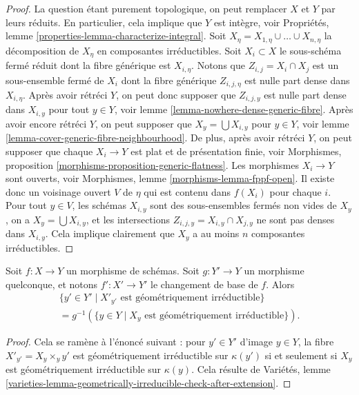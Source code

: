 \begin{proof}
La question étant purement topologique, on peut remplacer $X$ et $Y$ par
leurs réduits. En particulier, cela implique que $Y$ est intègre, voir
Propriétés, lemme \ref{properties-lemma-characterize-integral}.
Soit $X_\eta = X_{1, \eta} \cup \ldots \cup X_{n, \eta}$
la décomposition de $X_\eta$ en composantes irréductibles.
Soit $X_i \subset X$ le sous-schéma fermé réduit dont la fibre
générique est $X_{i, \eta}$. Notons que $Z_{i, j} = X_i \cap X_j$
est un sous-ensemble fermé de $X_i$ dont la fibre générique $Z_{i, j, \eta}$
est nulle part dense dans $X_{i, \eta}$. Après avoir rétréci $Y$, on peut donc
supposer que $Z_{i, j, y}$
est nulle part dense dans $X_{i, y}$ pour tout $y \in Y$, voir
lemme \ref{lemma-nowhere-dense-generic-fibre}.
Après avoir encore rétréci $Y$, on peut supposer que
$X_y = \bigcup X_{i, y}$ pour $y \in Y$, voir
lemme \ref{lemma-cover-generic-fibre-neighbourhood}.
De plus, après avoir rétréci $Y$, on peut supposer que chaque $X_i \to Y$
est plat et de présentation finie, voir
Morphismes, proposition \ref{morphisms-proposition-generic-flatness}.
Les morphismes $X_i \to Y$ sont ouverts, voir
Morphismes, lemme \ref{morphisms-lemma-fppf-open}.
Il existe donc un voisinage ouvert $V$ de $\eta$ qui est contenu
dans $f(X_i)$ pour chaque $i$.
Pour tout $y \in V$, les schémas $X_{i, y}$ sont des
sous-ensembles fermés non vides de $X_y$, on a $X_y = \bigcup X_{i, y}$,
et les intersections $Z_{i, j, y} = X_{i, y} \cap X_{j, y}$
ne sont pas denses dans $X_{i, y}$. Cela implique clairement que
$X_y$ a au moins $n$ composantes irréductibles.
\end{proof}

\begin{lemma}
\label{lemma-base-change-fibres-geometrically-irreducible}
Soit $f : X \to Y$ un morphisme de schémas.
Soit $g : Y' \to Y$ un morphisme quelconque, et notons
$f' : X' \to Y'$ le changement de base de $f$.
Alors
\begin{align*}
\{y' \in Y' \mid X'_{y'}\text{ est géométriquement irréductible}\} \\
= g^{-1}(\{y \in Y \mid X_y\text{ est géométriquement irréductible}\}).
\end{align*}
\end{lemma}

\begin{proof}
Cela se ramène à l'énoncé suivant : pour $y' \in Y'$ d'image
$y \in Y$, la fibre $X'_{y'} = X_y \times_y y'$ est géométriquement
irréductible sur $\kappa(y')$ si et seulement si $X_y$ est géométriquement
irréductible sur $\kappa(y)$. Cela résulte de
Variétés,
lemme \ref{varieties-lemma-geometrically-irreducible-check-after-extension}.
\end{proof}

